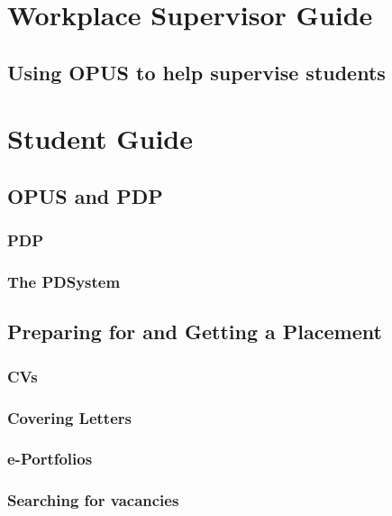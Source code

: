 \documentclass[12 pt]{book}
\begin{document}
\part{Workplace Supervisor Guide}

\chapter{Using OPUS to help supervise students}



\part{Student Guide}

%
%
%

\chapter{OPUS and PDP}

\section{PDP}

\section{The PDSystem}

%
%
%

\chapter{Preparing for and Getting a Placement}

\section{CVs}

\section{Covering Letters}

\section{e-Portfolios}

\section{Searching for vacancies}
\end{document}
